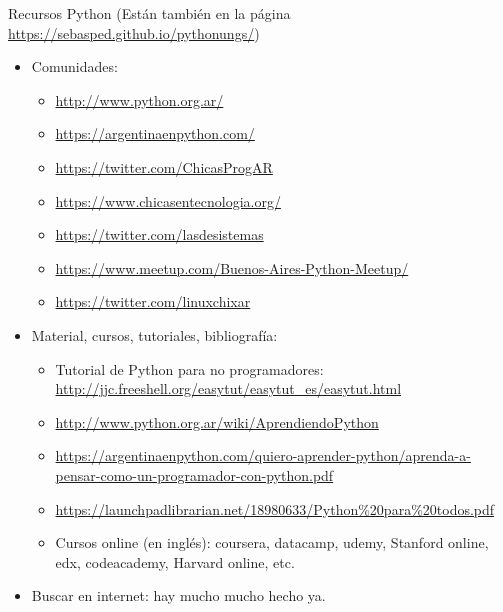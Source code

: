\documentclass{beamer}
\begin{document}
\begin{frame}{Recursos Python}
(\footnotesize Están también en la página \url{https://sebasped.github.io/pythonungs/})
\begin{itemize}
	\item Comunidades:
	\begin{itemize}
		\item \footnotesize\url{http://www.python.org.ar/}
		\item \footnotesize\url{https://argentinaenpython.com/}
		\item \footnotesize\url{https://twitter.com/ChicasProgAR}
		\item \footnotesize\url{https://www.chicasentecnologia.org/}
		\item \footnotesize\url{https://twitter.com/lasdesistemas}
		\item \footnotesize\url{https://www.meetup.com/Buenos-Aires-Python-Meetup/}
		\item \footnotesize\url{https://twitter.com/linuxchixar}
	\end{itemize}\pause
	\item Material, cursos, tutoriales, bibliografía:
	\begin{itemize}
		\item Tutorial de Python para no programadores: \footnotesize\url{http://jjc.freeshell.org/easytut/easytut_es/easytut.html}
		\item \footnotesize\url{http://www.python.org.ar/wiki/AprendiendoPython}
		\item \footnotesize\url{https://argentinaenpython.com/quiero-aprender-python/aprenda-a-pensar-como-un-programador-con-python.pdf}
		\item \footnotesize\url{https://launchpadlibrarian.net/18980633/Python\%20para\%20todos.pdf}
		\item Cursos online (en inglés): coursera, datacamp, udemy, Stanford online, edx, codeacademy, Harvard online, etc.
	\end{itemize}\pause
	\item Buscar en internet: hay mucho mucho hecho ya.
\end{itemize}
\end{frame}
\end{document}
